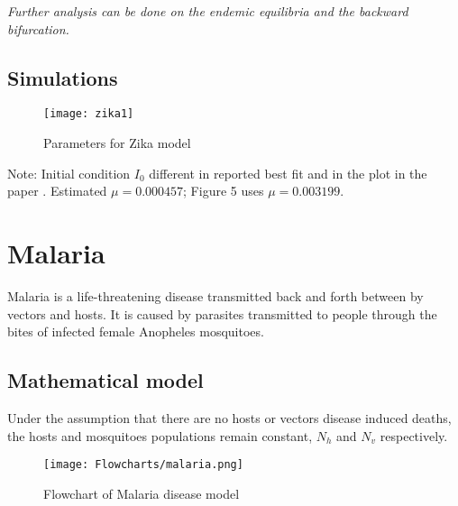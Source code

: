 \documentclass{book}\usepackage[]{graphicx}\usepackage[]{color}
\begin{document}
{\it Further analysis can be done on the endemic equilibria and the backward bifurcation.}

\subsection*{Simulations}

\begin{figure}[H]
    \centering
    \texttt{[image: zika1]}
    \caption{Parameters for Zika model}
    \label{fig:zika_params}
\end{figure}


Note: Initial condition $I_0$ different in reported best fit and in the plot in the paper \cite{bonyah2017theoretical}.
Estimated $\mu = 0.000457$; Figure 5 uses $\mu = 0.003199$.


\section{Malaria}

Malaria is a life-threatening disease transmitted back and forth between by vectors and hosts.
It is caused by parasites transmitted to people through the bites of infected female Anopheles mosquitoes.

\subsection*{Mathematical model}

Under the assumption that there are no hosts or vectors disease induced deaths, the hosts and mosquitoes populations remain constant, $N_h$ and $N_v$ respectively.
%
\begin{figure}[H]
    \centering
    \texttt{[image: Flowcharts/malaria.png]}
    \caption{Flowchart of Malaria disease model}
    \label{fig:malaria_flow}
\end{figure}
\end{document}
